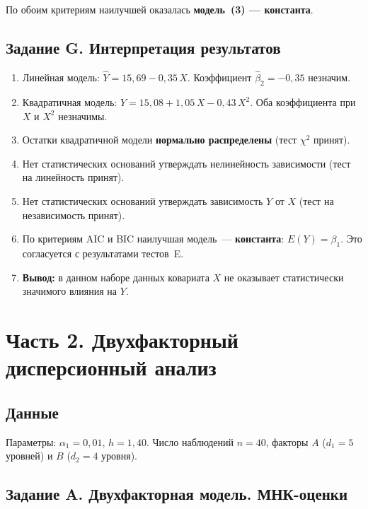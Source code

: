 \documentclass[12pt,a4paper]{article}
\begin{document}
По обоим критериям наилучшей оказалась \textbf{модель~(3) --- константа}.

\subsection{Задание G. Интерпретация результатов}

\begin{enumerate}
  \item Линейная модель: $\hat{Y} = 15{,}69 - 0{,}35\,X$. Коэффициент $\hat{\beta}_2 = -0{,}35$ незначим.
  \item Квадратичная модель: $\hat{Y} = 15{,}08 + 1{,}05\,X - 0{,}43\,X^2$. Оба коэффициента при $X$ и $X^2$ незначимы.
  \item Остатки квадратичной модели \textbf{нормально распределены} (тест $\chi^2$ принят).
  \item Нет статистических оснований утверждать нелинейность зависимости (тест на линейность принят).
  \item Нет статистических оснований утверждать зависимость $Y$ от $X$ (тест на независимость принят).
  \item По критериям AIC и BIC наилучшая модель~--- \textbf{константа}: $E(Y) = \beta_1$. Это согласуется с результатами тестов~E.
  \item \textbf{Вывод:} в данном наборе данных ковариата $X$ не оказывает статистически значимого влияния на $Y$.
\end{enumerate}

\newpage
\section{Часть 2. Двухфакторный дисперсионный анализ}

\subsection*{Данные}

Параметры: $\alpha_1 = 0{,}01$, $h = 1{,}40$.
Число наблюдений $n = 40$, факторы $A$ ($d_1 = 5$ уровней) и $B$ ($d_2 = 4$ уровня).

\subsection{Задание A. Двухфакторная модель. МНК-оценки}
\end{document}
